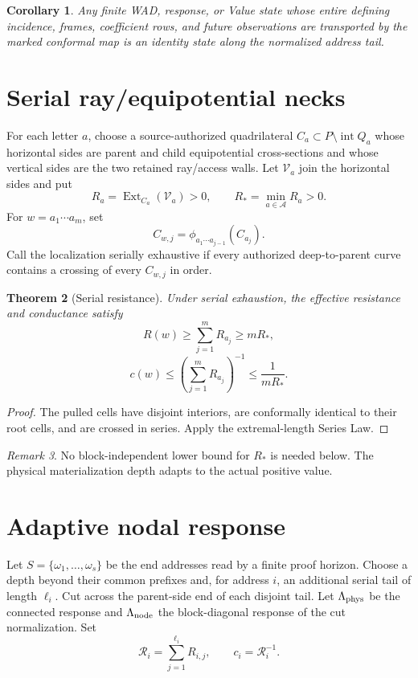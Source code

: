 \documentclass[11pt]{article}
\newtheorem{theorem}{Theorem}[section]
\newtheorem{corollary}[theorem]{Corollary}
\theoremstyle{definition}
\theoremstyle{remark}
\newtheorem{remark}[theorem]{Remark}
\newcommand{\Ext}{\operatorname{Ext}}
\begin{document}
\begin{corollary}
Any finite WAD, response, or Value state whose entire defining incidence,
frames, coefficient rows, and future observations are transported by the
marked conformal map is an identity state along the normalized address tail.
\end{corollary}

\section{Serial ray/equipotential necks}
For each letter $a$, choose a source-authorized quadrilateral
$C_a\subset P\setminus\operatorname{int}Q_a$ whose horizontal sides are
parent and child equipotential cross-sections and whose vertical sides are the
two retained ray/access walls.  Let $\mathcal V_a$ join the horizontal sides
and put
\[
 R_a=\Ext_{C_a}(\mathcal V_a)>0,\qquad
 R_*=\min_{a\in\mathcal A}R_a>0.
\]
For $w=a_1\cdots a_m$, set
\[
 C_{w,j}=\phi_{a_1\cdots a_{j-1}}(C_{a_j}).
\]
Call the localization serially exhaustive if every authorized deep-to-parent
curve contains a crossing of every $C_{w,j}$ in order.

\begin{theorem}[Serial resistance]
Under serial exhaustion, the effective resistance and conductance satisfy
\[
 R(w)\ge\sum_{j=1}^mR_{a_j}\ge mR_*,
\]
\[
 c(w)\le\left(\sum_{j=1}^mR_{a_j}\right)^{-1}
 \le\frac1{mR_*}.
\]
\end{theorem}

\begin{proof}
The pulled cells have disjoint interiors, are conformally identical to their
root cells, and are crossed in series.  Apply the extremal-length Series Law.
\end{proof}

\begin{remark}
No block-independent lower bound for $R_*$ is needed below.  The physical
materialization depth adapts to the actual positive value.
\end{remark}

\section{Adaptive nodal response}
Let $S=\{\omega_1,\dots,\omega_s\}$ be the end addresses read by a finite proof
horizon.  Choose a depth beyond their common prefixes and, for address $i$, an
additional serial tail of length $\ell_i$.  Cut across the parent-side end of
each disjoint tail.  Let $\Lambda_{\rm phys}$ be the connected response and
$\Lambda_{\rm node}$ the block-diagonal response of the cut normalization.
Set
\[
 \mathcal R_i=\sum_{j=1}^{\ell_i}R_{i,j},\qquad c_i=\mathcal R_i^{-1}.
\]
\end{document}
